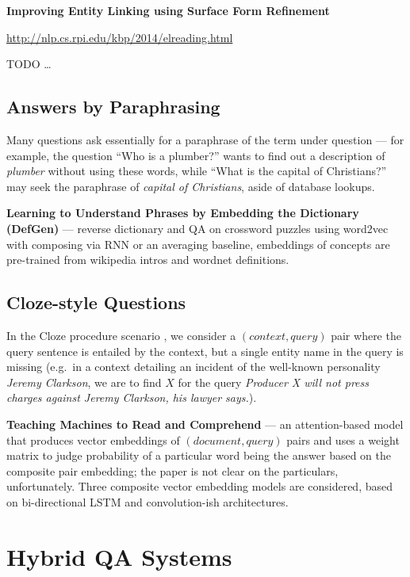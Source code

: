 \textbf{Improving Entity Linking using Surface Form Refinement}

\url{http://nlp.cs.rpi.edu/kbp/2014/elreading.html}

TODO \dots

\subsection{Answers by Paraphrasing}

Many questions ask essentially for a paraphrase of the term under
question --- for example, the question ``Who is a plumber?'' wants
to find out a description of \textit{plumber} without using these
words, while ``What is the capital of Christians?'' may seek the
paraphrase of \textit{capital of Christians}, aside of database lookups.

\textbf{Learning to Understand Phrases by Embedding the Dictionary (DefGen)} \citep{DefGen}
	--- reverse dictionary and QA on crossword puzzles using word2vec
	with composing via RNN or an averaging baseline, embeddings of
	concepts are pre-trained from wikipedia intros and wordnet definitions.

\subsection{Cloze-style Questions}

In the Cloze procedure scenario \citep{Cloze},
we consider a $(context, query)$ pair where the query
sentence is entailed by the context, but a single entity name in the query
is missing (e.g.\ in a context detailing an incident of the well-known personality
\textit{Jeremy Clarkson}, we are to find $X$ for the query
\textit{Producer X will not press charges against Jeremy Clarkson, his lawyer says.}).

\textbf{Teaching Machines to Read and Comprehend} \citep{ReadAndComprehend}
	--- an attention-based model that produces vector embeddings of $(document, query)$
	pairs and uses a weight matrix to judge probability of a particular
	word being the answer based on the composite pair embedding;
	the paper is not clear on the particulars, unfortunately.
	Three composite vector embedding models are considered,
	based on bi-directional LSTM and convolution-ish architectures.




\section{Hybrid QA Systems}

